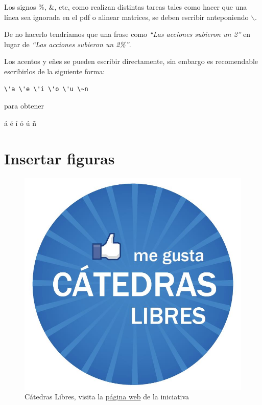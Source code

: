 \documentclass[letterpaper,twoside]{article}
\begin{document}
Los signos \%, \&, etc, como realizan distintas tareas tales como hacer que una l\'inea sea ignorada en el pdf o alinear matrices, se deben escribir anteponiendo $\backslash$.

De no hacerlo tendr\'iamos que una frase como \emph{``Las acciones subieron un 2''} en lugar de \emph{``Las acciones subieron un 2\%''}.

Los acentos y e\~nes se pueden escribir directamente, sin embargo es recomendable escribirlos de la siguiente forma:

\begin{verbatim}
\'a \'e \'i \'o \'u \~n
\end{verbatim}

para obtener
\begin{center}
\'a \'e \'i \'o \'u \~n
\end{center}

\newpage

\section{Insertar figuras}

\begin{figure}[h]
\centering
\includegraphics[scale=0.2]{logo.jpg} 
\caption{\textsf{C\'atedras Libres, visita la \href{https://www.facebook.com/catedraslibres?fref=ts}{p\'agina web} de la iniciativa}}
\end{figure}
\end{document}
